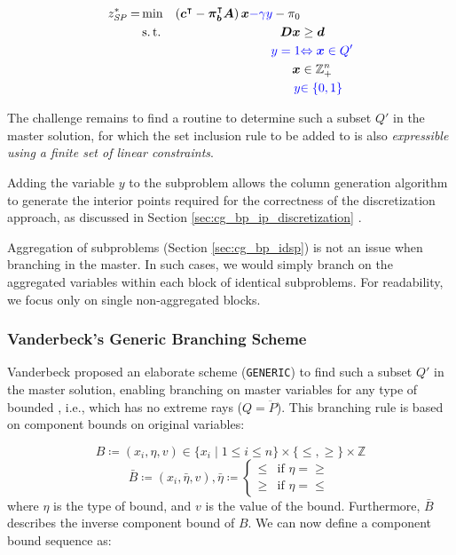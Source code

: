 \begin{equation}\label{eq:cg_bp_branchmaster_pricingmod}
\begin{aligned}
z^*_\SP{} = &\min & \left( \vec{c}\transpose - \vec{\pi}_\vec{b}\transpose \mat{A} \right) \vec{x} {\color{blue} - \gamma y} - \pi_0 & \\
&\st & \mat{D} \vec{x} & \geq \vec{d} \\
&& {\color{blue} y = 1} & {\color{blue} \Leftrightarrow \vec{x} \in Q'} \\
&& \vec{x} & \in \mathbb{Z}_+^n \\
&& {\color{blue} y} & {\color{blue} \in \{0, 1\}}
\end{aligned}
\end{equation}

The challenge remains to find a routine to determine such a subset $Q'$ in the master solution, for which the set inclusion rule to be added to \SP{} is also \textit{expressible using a finite set of linear constraints}.

\begin{note}
Adding the variable $y$ to the subproblem allows the column generation algorithm to generate the interior points required for the correctness of the discretization approach, as discussed in Section \ref{sec:cg_bp_ip_discretization} \cite{vanderbeck1996exact}.
\end{note}

\begin{note}
Aggregation of subproblems (Section \ref{sec:cg_bp_idsp}) is not an issue when branching in the master. In such cases, we would simply branch on the aggregated variables within each block of identical subproblems. For readability, we focus only on single non-aggregated blocks.
\end{note}

\subsubsection{Vanderbeck's Generic Branching Scheme}\label{sec:cg_bp_bp_branching_generic}
Vanderbeck proposed an elaborate scheme (\texttt{GENERIC}) to find such a subset $Q'$ in the master solution, enabling branching on master variables for any type of bounded \IP{}, i.e., which has no extreme rays ($Q = \ddot{P}$). This branching rule is based on component bounds on original variables:

\begin{equation}
B \coloneqq \left( x_i, \eta, v \right) \in \{x_i \mid 1 \leq i \leq n\} \times \{\leq, \geq\} \times \mathbb{Z}
\end{equation}
\begin{equation}
\bar{B} \coloneqq \left( x_i, \bar{\eta}, v \right), \bar{\eta} \coloneqq \begin{cases} \leq & \text{if } \eta = \geq \\ \geq & \text{if } \eta = \leq \end{cases}
\end{equation}
where $\eta$ is the type of bound, and $v$ is the value of the bound. Furthermore, $\bar{B}$ describes the inverse component bound of $B$. We can now define a component bound sequence as:

